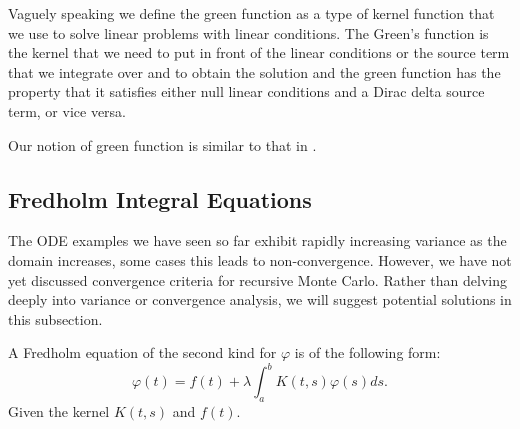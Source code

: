 \documentclass[a4paper,12pt]{article}
\begin{document}
\begin{definition}
    Vaguely speaking we define the green function as a type of kernel function that we use
    to solve linear problems with linear conditions. The Green's function is the kernel that
    we need to put in front of  the linear conditions or the source term that we integrate
    over and to obtain the solution  and the green function has the property that it satisfies
    either null linear conditions and a Dirac delta source term, or vice versa.
\end{definition}

\begin{related}
    Our notion of green function is similar to that in \cite{hwang_simulationtabulation_2001}.
\end{related}


\subsection{Fredholm Integral Equations}

The ODE examples we have seen so far exhibit rapidly increasing variance as the domain increases,
some cases this leads to non-convergence. However, we have not yet discussed convergence
criteria for recursive Monte Carlo. Rather than delving deeply into variance
or convergence analysis, we will suggest potential solutions in this subsection.

\begin{definition}
    A Fredholm equation of the second kind for $\varphi$  is of the following form:
    \begin{equation}
        \varphi(t)=f(t)+\lambda \int_a^b K(t, s) \varphi(s) ds.
    \end{equation}
    Given the kernel  $K(t, s)$  and  $ f(t)$.
\end{definition}
\end{document}
